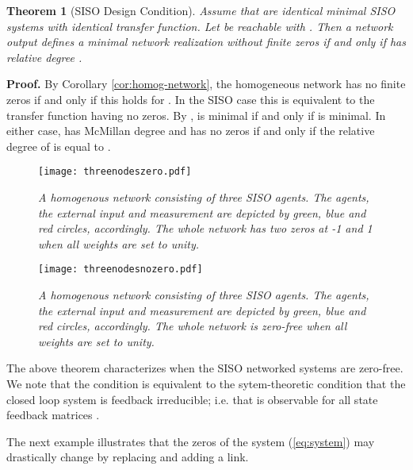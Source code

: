 \documentclass[twocolumn]{autart}    \usepackage{amsmath}
\newtheorem{theorem}{Theorem}
\begin{document}
\begin{theorem}[SISO Design Condition]\label{DESIGN}
Assume that   are
identical minimal SISO systems with identical transfer function. Let  be reachable with . Then a  network output
 defines a minimal network realization
  without finite zeros if and only if
  has relative degree . \end{theorem}



\noindent \textbf{Proof.}
By Corollary \ref{cor:homog-network}, the homogeneous network
  has no finite zeros
if and only if this holds for . In the SISO case this
is equivalent to the transfer function  having no
zeros. By \cite{fuhe2013},  is minimal if and only
if  is minimal. In either case,  has
McMillan degree  and has no zeros if and only if the relative
degree of  is equal to .
\hfill 

\begin{figure}[!t]
\begin{center}
    \texttt{[image: threenodeszero.pdf]}
    \caption{\emph{A homogenous network consisting of three SISO agents. The agents, the external input and measurement are depicted  by green, blue and red circles, accordingly. The whole network has two zeros at -1 and 1 when all weights are set to unity.}} \label{fig:threeagentszero}
\end{center}
\end{figure}




\begin{figure}[!t]
\begin{center}
    \texttt{[image: threenodesnozero.pdf]}
    \caption{\emph{A homogenous network consisting of three SISO agents. The agents, the external input and measurement are depicted by green, blue and red circles, accordingly. The whole network is zero-free when all  weights are set to unity.}} \label{fig:threeagentsnozero}
\end{center}
\end{figure}



The above theorem characterizes when the SISO networked systems are
zero-free. We note that the condition is equivalent to the
sytem-theoretic condition that the closed loop
system  is feedback
irreducible; i.e. that  is observable
for all state feedback matrices .

The next example illustrates  that  the zeros of  the system (\ref{eq:system}) may drastically change  by replacing and adding   a link.
\end{document}
